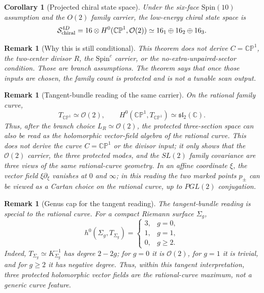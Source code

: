 \documentclass[
  aps,
  prd,
  preprint,
  nofootinbib,
  superscriptaddress,
  longbibliography
]{revtex4-2}
\newcommand{\Spin}{\mathrm{Spin}}
\newcommand{\CP}{\mathbb{CP}}
\newcommand{\cO}{\mathcal{O}}
\newtheorem{corollary}[theorem]{Corollary}
\newtheorem{remark}[theorem]{Remark}
\begin{document}
\begin{corollary}[Projected chiral state space]
Under the six-face \(\Spin(10)\) assumption and the \(O(2)\) family carrier,
the low-energy chiral state space is
\[
  {\cal S}_{\rm chiral}^{4D}
  =
  16\otimes H^0(\CP^1,\cO(2))
  \simeq
  16_1\oplus16_2\oplus16_3 .
\]
\end{corollary}

\begin{remark}[Why this is still conditional]
This theorem does not derive \(C=\CP^1\), the two-center divisor \(R\), the
\(\Spin^c\) carrier, or the no-extra-unpaired-sector condition.
Those are branch assumptions.  The theorem says that once those inputs are
chosen, the family count is protected and is not a tunable scan output.
\end{remark}

\begin{remark}[Tangent-bundle reading of the same carrier]
On the rational family curve,
\[
  T_{\CP^1}\simeq \cO(2),
  \qquad
  H^0(\CP^1,T_{\CP^1})\simeq \mathfrak{sl}_2(\mathbb C).
\]
Thus, after the branch choice \(L_R\simeq\cO(2)\), the protected three-section
space can also be read as the holomorphic vector-field algebra of the
rational curve.  This does not derive the curve \(C=\CP^1\) or the divisor
input; it only shows that the \(\cO(2)\) carrier, the three protected modes,
and the \(SL(2)\) family covariance are three views of the same rational-curve
geometry.  In an affine coordinate \(\xi\), the vector field
\(\xi\partial_\xi\) vanishes at \(0\) and \(\infty\); in this reading the two
marked points \(p_\pm\) can be viewed as a Cartan choice on the rational
curve, up to \(PGL(2)\) conjugation.
\end{remark}

\begin{remark}[Genus cap for the tangent reading]
The tangent-bundle reading is special to the rational curve.  For a compact
Riemann surface \(\Sigma_g\),
\[
  h^0(\Sigma_g,T_{\Sigma_g})
  =
  \begin{cases}
  3,& g=0,\\
  1,& g=1,\\
  0,& g\ge2.
  \end{cases}
\]
Indeed, \(T_{\Sigma_g}\simeq K_{\Sigma_g}^{-1}\) has degree \(2-2g\); for
\(g=0\) it is \(\cO(2)\), for \(g=1\) it is trivial, and for \(g\ge2\) it has
negative degree.  Thus, within this tangent interpretation, three protected
holomorphic vector fields are the rational-curve maximum, not a generic curve
feature.
\end{remark}
\end{document}
